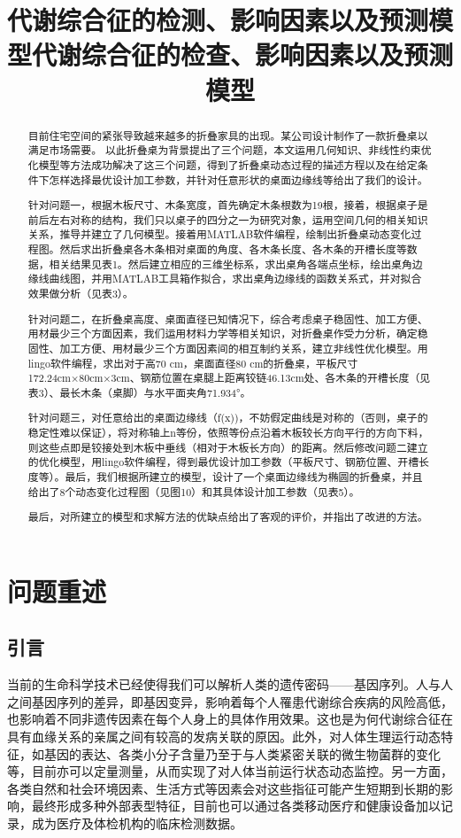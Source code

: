 \documentclass[bwprint]{cumcmthesis}
\title{代谢综合征的检测、影响因素以及预测模型}
\title{代谢综合征的检查、影响因素以及预测模型}
\begin{document}
 \maketitle
 \begin{abstract}
 目前住宅空间的紧张导致越来越多的折叠家具的出现。某公司设计制作了一款折叠桌以满足市场需要。
 以此折叠桌为背景提出了三个问题，本文运用几何知识、非线性约束优化模型等方法成功解决了这三个问题，得到了折叠桌动态过程的描述方程以及在给定条件下怎样选择最优设计加工参数，并针对任意形状的桌面边缘线等给出了我们的设计。

针对问题一，根据木板尺寸、木条宽度，首先确定木条根数为19根，接着，根据桌子是前后左右对称的结构，我们只以桌子的四分之一为研究对象，运用空间几何的相关知识关系，推导并建立了几何模型。接着用MATLAB软件编程，绘制出折叠桌动态变化过程图。然后求出折叠桌各木条相对桌面的角度、各木条长度、各木条的开槽长度等数据，相关结果见表1。然后建立相应的三维坐标系，求出桌角各端点坐标，绘出桌角边缘线曲线图，并用MATLAB工具箱作拟合，求出桌角边缘线的函数关系式，并对拟合效果做分析（见表3）。

针对问题二，在折叠桌高度、桌面直径已知情况下，综合考虑桌子稳固性、加工方便、用材最少三个方面因素，我们运用材料力学等相关知识，对折叠桌作受力分析，确定稳固性、加工方便、用材最少三个方面因素间的相互制约关系，建立非线性优化模型。用lingo软件编程，求出对于高70 cm，桌面直径80 cm的折叠桌，平板尺寸172.24cm×80cm×3cm、钢筋位置在桌腿上距离铰链46.13cm处、各木条的开槽长度（见表3）、最长木条（桌脚）与水平面夹角71.934°。

针对问题三，对任意给出的桌面边缘线（f(x))，不妨假定曲线是对称的（否则，桌子的稳定性难以保证），将对称轴上n等份，依照等份点沿着木板较长方向平行的方向下料，则这些点即是铰接处到木板中垂线（相对于木板长方向）的距离。然后修改问题二建立的优化模型，用lingo软件编程，得到最优设计加工参数（平板尺寸、钢筋位置、开槽长度等）。最后，我们根据所建立的模型，设计了一个桌面边缘线为椭圆的折叠桌，并且给出了8个动态变化过程图（见图10）和其具体设计加工参数（见表5）。

最后，对所建立的模型和求解方法的优缺点给出了客观的评价，并指出了改进的方法。

\end{abstract}

\section{问题重述}
\subsection{引言}
当前的生命科学技术已经使得我们可以解析人类的遗传密码——基因序列。人与人之间基因序列的差异，即基因变异，影响着每个人罹患代谢综合疾病的风险高低，也影响着不同非遗传因素在每个人身上的具体作用效果。这也是为何代谢综合征在具有血缘关系的亲属之间有较高的发病关联的原因。此外，对人体生理运行动态特征，如基因的表达、各类小分子含量乃至于与人类紧密关联的微生物菌群的变化等，目前亦可以定量测量，从而实现了对人体当前运行状态动态监控。另一方面，各类自然和社会环境因素、生活方式等因素会对这些指征可能产生短期到长期的影响，最终形成多种外部表型特征，目前也可以通过各类移动医疗和健康设备加以记录，成为医疗及体检机构的临床检测数据。
\end{document}
